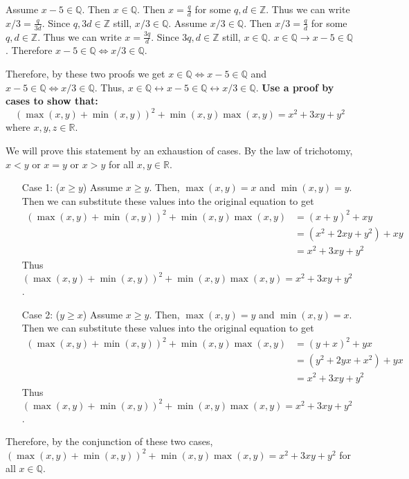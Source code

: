\documentclass[letterpaper, 12pt]{article}
\begin{document}
Assume $x-5\in\mathbb{Q}$. Then $x\in\mathbb{Q}$. Then $x = \frac{q}{d}$ for some $q,d\in\mathbb{Z}$. Thus we can write $x/3 = \frac{q}{3d}$. Since $q,3d\in\mathbb{Z}$ still, $x/3\in\mathbb{Q}$. Assume $x/3\in\mathbb{Q}$. Then $x/3 = \frac{q}{d}$ for some $q,d\in\mathbb{Z}$. Thus we can write $x = \frac{3q}{d}$. Since $3q,d\in\mathbb{Z}$ still, $x\in\mathbb{Q}$. $x\in\mathbb{Q}\rightarrow x-5\in\mathbb{Q}$. Therefore $x-5\in\mathbb{Q}\Leftrightarrow x/3\in\mathbb{Q}$.

Therefore, by these two proofs we get $x\in\mathbb{Q}\Leftrightarrow x-5\in\mathbb{Q}$ and $x-5\in\mathbb{Q}\Leftrightarrow x/3\in\mathbb{Q}$. Thus, $x\in\mathbb{Q}\leftrightarrow x-5\in\mathbb{Q} \leftrightarrow x/3\in\mathbb{Q}$.
\newpage
\noindent\textbf{Use a proof by cases to show that:}
$$\left(\max\left(x,y\right) + \min\left(x,y\right)\right)^2 + \min\left(x,y\right)\max\left(x,y\right) = x^2 + 3xy + y^2$$
where $x,y,z\in\mathbb{R}.$

We will prove this statement by an exhaustion of cases. By the law of trichotomy, $x < y$ or $x=y$ or $x>y$ for all $x,y\in\mathbb{R}$.
\begin{itemize}
    \item[Case 1:] ($x\geq y$) Assume $x\geq y$. Then, $\max(x,y) = x$ and $\min(x,y) = y$. Then we can substitute these values into the original equation to get
    \begin{align*}
        \left(\max\left(x,y\right) + \min\left(x,y\right)\right)^2 + \min\left(x,y\right)\max\left(x,y\right) &= (x + y)^2 +xy\\
        &= (x^2 + 2xy + y^2) + xy\\
        &= x^2 +3xy +y^2
    \end{align*}
    Thus $\left(\max\left(x,y\right) + \min\left(x,y\right)\right)^2 + \min\left(x,y\right)\max\left(x,y\right) = x^2 + 3xy + y^2$.
    
    \item[Case 2:] ($y \geq x$) Assume $x\geq y$. Then, $\max(x,y) = y$ and $\min(x,y) = x$. Then we can substitute these values into the original equation to get
    \begin{align*}
        \left(\max\left(x,y\right) + \min\left(x,y\right)\right)^2 + \min\left(x,y\right)\max\left(x,y\right) &= (y + x)^2 +yx\\
        &= (y^2 + 2yx + x^2) + yx\\
        &= x^2 +3xy +y^2
    \end{align*}
    Thus $\left(\max\left(x,y\right) + \min\left(x,y\right)\right)^2 + \min\left(x,y\right)\max\left(x,y\right) = x^2 + 3xy + y^2$.
\end{itemize}
Therefore, by the conjunction of these two cases, $\left(\max\left(x,y\right) + \min\left(x,y\right)\right)^2 + \min\left(x,y\right)\max\left(x,y\right) = x^2 + 3xy + y^2$ for all $x\in\mathbb{Q}$.
\end{document}
